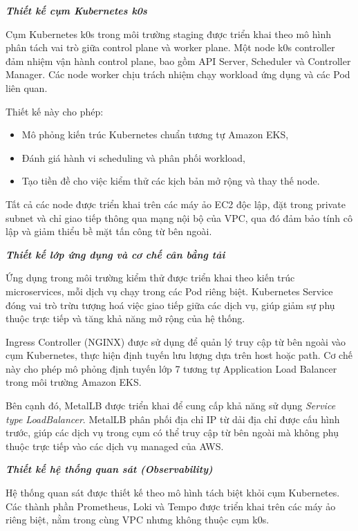 \textit{\textbf{Thiết kế cụm Kubernetes k0s}}

Cụm Kubernetes k0s trong môi trường staging được triển khai theo mô hình phân tách 
vai trò giữa control plane và worker plane. Một node k0s controller đảm nhiệm vận hành 
control plane, bao gồm API Server, Scheduler và Controller Manager. Các node worker 
chịu trách nhiệm chạy workload ứng dụng và các Pod liên quan.

Thiết kế này cho phép:
\begin{itemize}
    \item Mô phỏng kiến trúc Kubernetes chuẩn tương tự Amazon EKS,
    \item Đánh giá hành vi scheduling và phân phối workload,
    \item Tạo tiền đề cho việc kiểm thử các kịch bản mở rộng và thay thế node.
\end{itemize}

Tất cả các node được triển khai trên các máy ảo EC2 độc lập, đặt trong private subnet 
và chỉ giao tiếp thông qua mạng nội bộ của VPC, qua đó đảm bảo tính cô lập và giảm thiểu 
bề mặt tấn công từ bên ngoài.

\textit{\textbf{Thiết kế lớp ứng dụng và cơ chế cân bằng tải}}

Ứng dụng trong môi trường kiểm thử được triển khai theo kiến trúc microservices, 
mỗi dịch vụ chạy trong các Pod riêng biệt. Kubernetes Service đóng vai trò trừu tượng 
hoá việc giao tiếp giữa các dịch vụ, giúp giảm sự phụ thuộc trực tiếp và tăng khả năng 
mở rộng của hệ thống.

Ingress Controller (NGINX) được sử dụng để quản lý truy cập từ bên ngoài vào cụm Kubernetes, 
thực hiện định tuyến lưu lượng dựa trên host hoặc path. Cơ chế này cho phép mô phỏng 
định tuyến lớp 7 tương tự Application Load Balancer trong môi trường Amazon EKS.

Bên cạnh đó, MetalLB được triển khai để cung cấp khả năng sử dụng 
\textit{Service type LoadBalancer}. MetalLB phân phối địa chỉ IP từ dải địa chỉ được 
cấu hình trước, giúp các dịch vụ trong cụm có thể truy cập từ bên ngoài mà không phụ 
thuộc trực tiếp vào các dịch vụ managed của AWS.

\textit{\textbf{Thiết kế hệ thống quan sát (Observability)}}

Hệ thống quan sát được thiết kế theo mô hình tách biệt khỏi cụm Kubernetes. 
Các thành phần Prometheus, Loki và Tempo được triển khai trên các máy ảo riêng biệt, 
nằm trong cùng VPC nhưng không thuộc cụm k0s.

